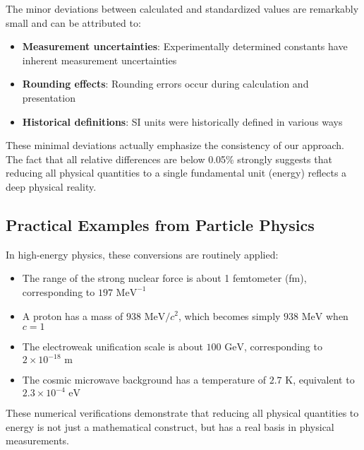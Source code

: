 \documentclass{article}
\begin{document}
	The minor deviations between calculated and standardized values are remarkably small and can be attributed to:
	
	\begin{itemize}
		\item \textbf{Measurement uncertainties}: Experimentally determined constants have inherent measurement uncertainties
		\item \textbf{Rounding effects}: Rounding errors occur during calculation and presentation
		\item \textbf{Historical definitions}: SI units were historically defined in various ways
	\end{itemize}
	
	These minimal deviations actually emphasize the consistency of our approach. The fact that all relative differences are below 0.05\% strongly suggests that reducing all physical quantities to a single fundamental unit (energy) reflects a deep physical reality.
	
	\subsection{Practical Examples from Particle Physics}
	
	In high-energy physics, these conversions are routinely applied:
	
	\begin{itemize}
		\item The range of the strong nuclear force is about 1 femtometer (fm), corresponding to $197 \text{ MeV}^{-1}$
		\item A proton has a mass of $938 \text{ MeV}/c^2$, which becomes simply $938 \text{ MeV}$ when $c = 1$
		\item The electroweak unification scale is about $100 \text{ GeV}$, corresponding to $2 \times 10^{-18} \text{ m}$
		\item The cosmic microwave background has a temperature of $2.7 \text{ K}$, equivalent to $2.3 \times 10^{-4} \text{ eV}$
	\end{itemize}
	
	These numerical verifications demonstrate that reducing all physical quantities to energy is not just a mathematical construct, but has a real basis in physical measurements.
\end{document}
